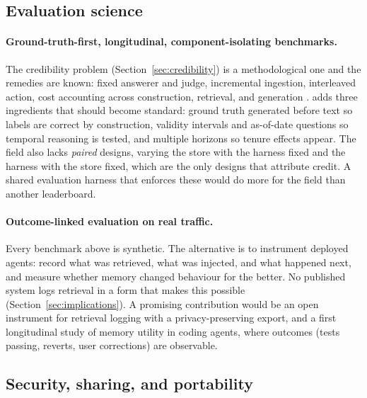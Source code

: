 \documentclass[11pt]{article}
\begin{document}
\subsection{Evaluation science}

\paragraph{Ground-truth-first, longitudinal, component-isolating benchmarks.}
The credibility problem (Section~\ref{sec:credibility}) is a methodological one and the remedies are known: fixed answerer and judge, incremental ingestion, interleaved action, cost accounting across construction, retrieval, and generation \citep{jiang2026anatomy,hu2025memoryagentbench,omri2026systems}. \citet{spencer2026groundtruth} adds three ingredients that should become standard: ground truth generated before text so labels are correct by construction, validity intervals and as-of-date questions so temporal reasoning is tested, and multiple horizons so tenure effects appear. The field also lacks \emph{paired} designs, varying the store with the harness fixed and the harness with the store fixed, which are the only designs that attribute credit. A shared evaluation harness that enforces these would do more for the field than another leaderboard.

\paragraph{Outcome-linked evaluation on real traffic.}
Every benchmark above is synthetic. The alternative is to instrument deployed agents: record what was retrieved, what was injected, and what happened next, and measure whether memory changed behaviour for the better. No published system logs retrieval in a form that makes this possible (Section~\ref{sec:implications}). A promising contribution would be an open instrument for retrieval logging with a privacy-preserving export, and a first longitudinal study of memory utility in coding agents, where outcomes (tests passing, reverts, user corrections) are observable.

\subsection{Security, sharing, and portability}
\end{document}
